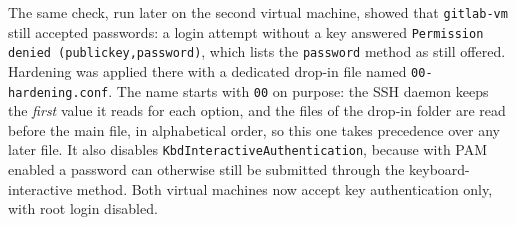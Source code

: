 The same check, run later on the second virtual machine, showed that \texttt{gitlab-vm} still accepted passwords: a login attempt without a key answered \texttt{Permission denied (publickey,password)}, which lists the \texttt{password} method as still offered. Hardening was applied there with a dedicated drop-in file named \texttt{00-hardening.conf}. The name starts with \texttt{00} on purpose: the SSH daemon keeps the \emph{first} value it reads for each option, and the files of the drop-in folder are read before the main file, in alphabetical order, so this one takes precedence over any later file. It also disables \texttt{KbdInteractiveAuthentication}, because with PAM enabled a password can otherwise still be submitted through the keyboard-interactive method. Both virtual machines now accept key authentication only, with root login disabled.

\clearpage
